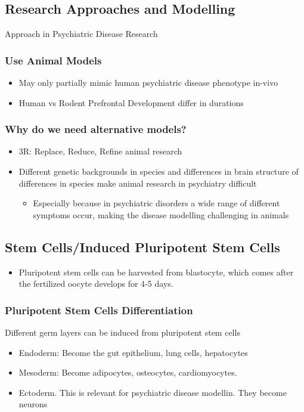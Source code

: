 \begin{itemize}
\subsection{Research Approaches and Modelling}
Approach in Psychiatric Disease Research
\subsubsection{Use Animal Models}
\begin{itemize}
    \item May only partially mimic human psychiatric disease phenotype in-vivo
    \item Human vs Rodent Prefrontal Development differ in durations
\end{itemize}

\subsubsection{Why do we need alternative models?}
\begin{itemize}
    \item 3R: Replace, Reduce, Refine animal research
    \item Different genetic backgrounds in species and differences in brain structure of differences in species make animal research in psychiatry difficult 
    \begin{itemize}
        \item Especially because in psychiatric disorders a wide range of different symptoms occur, making the disease modelling challenging in animals 
    \end{itemize}
\end{itemize}
\subsection{Stem Cells/Induced Pluripotent Stem Cells}
\begin{itemize}
    \item Pluripotent stem cells can be harvested from blastocyte, which comes after the fertilized oocyte develops for 4-5 days.
\end{itemize}
\subsubsection{Pluripotent Stem Cells Differentiation}
 Different germ layers can be induced from pluripotent stem cells
\begin{itemize}
    \item Endoderm: Become the gut epithelium, lung cells, hepatocytes
    \item Mesoderm: Become adipocytes, osteocytes, cardiomyocytes.
    \item Ectoderm. This is relevant for psychiatric disease modellin. They become neurons
\end{itemize}

\end{itemize}
